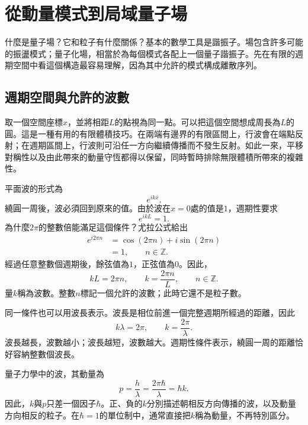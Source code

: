 \chapter{從動量模式到局域量子場}

什麼是量子場？它和粒子有什麼關係？基本的數學工具是諧振子。場包含許多可能的振盪模式；量子化場，相當於為每個模式各配上一個量子諧振子。先在有限的週期空間中看這個構造最容易理解，因為其中允許的模式構成離散序列。

\section{週期空間與允許的波數}

取一個空間座標\(x\)，並將相距\(L\)的點視為同一點。可以把這個空間想成周長為\(L\)的圓。這是一種有用的有限體積技巧。在兩端有邊界的有限區間上，行波會在端點反射；在週期區間上，行波則可沿任一方向繼續傳播而不發生反射。如此一來，平移對稱性以及由此帶來的動量守恆都得以保留，同時暫時排除無限體積所帶來的複雜性。

平面波的形式為
\begin{equation}
e^{ikx}.
\end{equation}
繞圓一周後，波必須回到原來的值。由於波在\(x=0\)處的值是\(1\)，週期性要求
\begin{equation}
e^{ikL}=1.
\end{equation}
為什麼\(2\pi\)的整數倍能滿足這個條件？尤拉公式給出
\begin{align}
e^{i2\pi n}
&=\cos(2\pi n)+i\sin(2\pi n)\\
&=1,
\qquad n\in\mathbb Z.
\end{align}
經過任意整數個週期後，餘弦值為\(1\)，正弦值為\(0\)。因此，
\begin{equation}
kL=2\pi n,
\qquad
k=\frac{2\pi n}{L},
\qquad n\in\mathbb Z.
\end{equation}
量\(k\)稱為波數。整數\(n\)標記一個允許的波數；此時它還不是粒子數。

同一條件也可以用波長表示。波長是相位前進一個完整週期所經過的距離，因此
\begin{equation}
k\lambda=2\pi,
\qquad
k=\frac{2\pi}{\lambda}.
\end{equation}
波長越長，波數越小；波長越短，波數越大。週期性條件表示，繞圓一周的距離恰好容納整數個波長。

量子力學中的波，其動量為
\begin{equation}
p=\frac{h}{\lambda}
=\frac{2\pi\hbar}{\lambda}
=\hbar k.
\end{equation}
因此，\(k\)與\(p\)只差一個因子\(\hbar\)。正、負的\(k\)分別描述朝相反方向傳播的波，以及動量方向相反的粒子。在\(\hbar=1\)的單位制中，通常直接把\(k\)稱為動量，不再特別區分。

